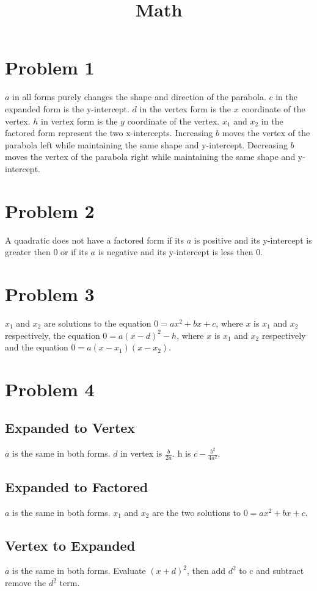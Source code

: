 \documentclass[12pt, letterpaper, twoside]{article}
\title{Math}
\begin{document}
	
	\maketitle
\section{Problem 1}
$a$ in all forms purely changes the shape and direction of the parabola. $c$ in the expanded form is the y-intercept. $d$ in the vertex form is the $x$ coordinate of the vertex. $h$ in vertex form is the $y$ coordinate of the vertex. $x_1$ and $x_2$ in the factored form represent the two x-intercepts. Increasing $b$ moves the vertex of the parabola left while maintaining the same shape and y-intercept. Decreasing $b$ moves the vertex of the parabola right while maintaining the same shape and y-intercept.
\section{Problem 2}
A quadratic does not have a factored form if its $a$ is positive and its y-intercept is greater then 0 or if its $a$ is negative and its y-intercept is less then $0$.
\section{Problem 3}
$x_1$ and $x_2$ are solutions to the equation $0 = ax^2 + bx + c$, where $x$ is $x_1$ and $x_2$ respectively, the equation $0 = a(x-d)^2 - h$, where $x$ is $x_1$ and $x_2$ respectively and the equation $0 = a(x-x_1)(x-x_2)$.
\section{Problem 4}
\subsection{Expanded to Vertex}
$a$ is the same in both forms. $d$ in vertex is $\frac{b}{2a}$. h is $c - \frac{b^2}{4a^2}$.
\subsection{Expanded to Factored}
$a$ is the same in both forms. $x_1$ and $x_2$ are the two solutions to $0 = ax^2+bx+c$.
\subsection{Vertex to Expanded}
$a$ is the same in both forms. Evaluate $(x+d)^2$, then add $d^2$ to c and subtract remove the $d^2$ term. 
\end{document}
